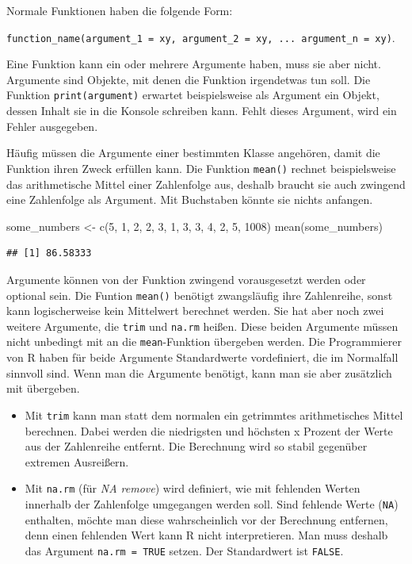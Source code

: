 \documentclass[
]{book}
\newenvironment{Shaded}{\begin{snugshade}}{\end{snugshade}}
\newcommand{\DecValTok}[1]{\textcolor[rgb]{0.00,0.00,0.81}{#1}}
\newcommand{\FunctionTok}[1]{\textcolor[rgb]{0.00,0.00,0.00}{#1}}
\newcommand{\NormalTok}[1]{#1}
\newcommand{\OtherTok}[1]{\textcolor[rgb]{0.56,0.35,0.01}{#1}}
\begin{document}
Normale Funktionen haben die folgende Form:

\texttt{function\_name(argument\_1\ =\ xy,\ argument\_2\ =\ xy,\ ...\ argument\_n\ =\ xy)}.

Eine Funktion kann ein oder mehrere Argumente haben, muss sie aber nicht. Argumente sind Objekte, mit denen die Funktion irgendetwas tun soll. Die Funktion \texttt{print(argument)} erwartet beispielsweise als Argument ein Objekt, dessen Inhalt sie in die Konsole schreiben kann. Fehlt dieses Argument, wird ein Fehler ausgegeben.

Häufig müssen die Argumente einer bestimmten Klasse angehören, damit die Funktion ihren Zweck erfüllen kann. Die Funktion \texttt{mean()} rechnet beispielsweise das arithmetische Mittel einer Zahlenfolge aus, deshalb braucht sie auch zwingend eine Zahlenfolge als Argument. Mit Buchstaben könnte sie nichts anfangen.

\begin{Shaded}
\begin{Highlighting}[]
\NormalTok{some\_numbers }\OtherTok{\textless{}{-}} \FunctionTok{c}\NormalTok{(}\DecValTok{5}\NormalTok{, }\DecValTok{1}\NormalTok{, }\DecValTok{2}\NormalTok{, }\DecValTok{2}\NormalTok{, }\DecValTok{3}\NormalTok{, }\DecValTok{1}\NormalTok{, }\DecValTok{3}\NormalTok{, }\DecValTok{3}\NormalTok{, }\DecValTok{4}\NormalTok{, }\DecValTok{2}\NormalTok{, }\DecValTok{5}\NormalTok{, }\DecValTok{1008}\NormalTok{)}
\FunctionTok{mean}\NormalTok{(some\_numbers)}
\end{Highlighting}
\end{Shaded}

\begin{verbatim}
## [1] 86.58333
\end{verbatim}

Argumente können von der Funktion zwingend vorausgesetzt werden oder optional sein. Die Funtion \texttt{mean()} benötigt zwangsläufig ihre Zahlenreihe, sonst kann logischerweise kein Mittelwert berechnet werden. Sie hat aber noch zwei weitere Argumente, die \texttt{trim} und \texttt{na.rm} heißen. Diese beiden Argumente müssen nicht unbedingt mit an die \texttt{mean}-Funktion übergeben werden. Die Programmierer von R haben für beide Argumente Standardwerte vordefiniert, die im Normalfall sinnvoll sind. Wenn man die Argumente benötigt, kann man sie aber zusätzlich mit übergeben.

\begin{itemize}
\item
  Mit \texttt{trim} kann man statt dem normalen ein getrimmtes arithmetisches Mittel berechnen. Dabei werden die niedrigsten und höchsten x Prozent der Werte aus der Zahlenreihe entfernt. Die Berechnung wird so stabil gegenüber extremen Ausreißern.
\item
  Mit \texttt{na.rm} (für \emph{NA remove}) wird definiert, wie mit fehlenden Werten innerhalb der Zahlenfolge umgegangen werden soll. Sind fehlende Werte (\texttt{NA}) enthalten, möchte man diese wahrscheinlich vor der Berechnung entfernen, denn einen fehlenden Wert kann R nicht interpretieren. Man muss deshalb das Argument \texttt{na.rm\ =\ TRUE} setzen. Der Standardwert ist \texttt{FALSE}.
\end{itemize}
\end{document}
